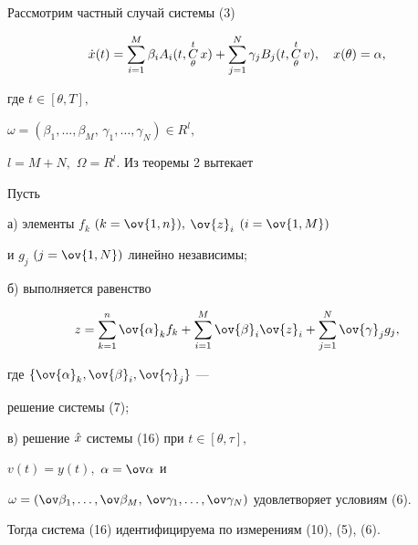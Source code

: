 Рассмотрим частный случай системы (3)


\begin{equation}


\Dot{x}(t) = \sum_{i=1}^M \beta_i A_i(t,\updown{\theta}{t} x) +


\sum_{j=1}^N \gamma_j B_j(t,\updown{\theta}{t} v),\quad


x(\theta)=\alpha,


\end{equation}


где $t\in[\theta,T],$


$\omega=(\beta_1,\dotsc,\beta_M,\,\gamma_1,\dotsc,\gamma_N) \in R^l,$


$l=M+N,$ $\Omega = R^l.$ Из теоремы 2 вытекает





\begin{cor}


Пусть





а) элементы $f_k$ $(k=\ov{1,n}),$ $\ov{z}_i$ $(i=\ov{1,M})$


и $g_j$ $(j=\ov{1,N})$ линейно независимы;





б) выполняется равенство


$$


z=\sum\limits_{k=1}^n\ov{\alpha}_k f_k +


\sum\limits_{i=1}^M\ov{\beta}_i \ov{z}_i +


\sum\limits_{j=1}^N\ov{\gamma}_j g_j,


$$


где $\{\ov{\alpha}_k,\ov{\beta}_i, \ov{\gamma}_j\}$ ---


решение системы (7);





в) решение $\Hat{x}$ системы (16) при $t\in[\theta,\tau],$


$v(t) = y(t),$ $\alpha = \ov\alpha$ и


$\omega=(\ov\beta_1,\dotsc,\ov\beta_M,\,


\ov\gamma_1,\dotsc,\ov\gamma_N)$ удовлетворяет условиям (6).





Тогда система (16) идентифицируема по измерениям (10), (5), (6).


\end{cor}





